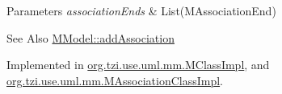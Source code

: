 \begin{DoxyParams}{Parameters}
{\em association\-Ends} & List(\-M\-Association\-End) \\
\hline
\end{DoxyParams}
\begin{DoxySeeAlso}{See Also}
\hyperlink{classorg_1_1tzi_1_1use_1_1uml_1_1mm_1_1_m_model_a8edbbb3d84dc746731b00acd5e93dff6}{M\-Model\-::add\-Association} 
\end{DoxySeeAlso}


Implemented in \hyperlink{classorg_1_1tzi_1_1use_1_1uml_1_1mm_1_1_m_class_impl_adeb4fd7ca82120d1f83944ffa906ddc3}{org.\-tzi.\-use.\-uml.\-mm.\-M\-Class\-Impl}, and \hyperlink{classorg_1_1tzi_1_1use_1_1uml_1_1mm_1_1_m_association_class_impl_a0167d0d72d55bba66573bb76780a6adb}{org.\-tzi.\-use.\-uml.\-mm.\-M\-Association\-Class\-Impl}.


